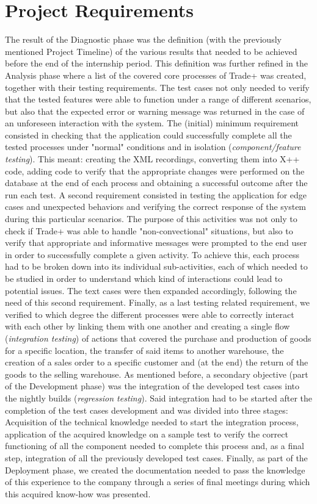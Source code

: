 \chapter{Project Requirements}

The result of the Diagnostic phase was the definition (with the previously mentioned Project Timeline) of the various results that needed to be achieved before the end of the internship period. This definition was further refined in the Analysis phase where a list of the covered core processes of Trade+ was created, together with their testing requirements. 
The test cases not only needed to verify that the tested features were able to function under a range of different scenarios, but also that the expected error or warning message was returned in the case of an unforeseen interaction with the system. 
The (initial) minimum  requirement consisted in checking that the application could successfully complete all the tested processes under "normal" conditions and in isolation (\textit{component/feature testing}). This meant: creating the XML recordings, converting them into X++ code, adding code to verify that the appropriate changes were performed on the database at the end of each process and obtaining a successful outcome after the run each test. 
A second requirement consisted in testing the application for edge cases and unexpected behaviors and verifying the correct response of the system during this particular scenarios. The purpose of this activities was not only to check if Trade+ was able to handle "non-convectional" situations, but also to verify that appropriate and informative messages were prompted to the end user in order to successfully complete a given activity. 
To achieve this, each process had to be broken down into its individual sub-activities, each of which needed to be studied in order to understand which kind of interactions could lead to potential issues. The text cases were then expanded accordingly, following the need of this second requirement. 
Finally, as a last testing related requirement, we verified to which degree the different processes were able to correctly interact with each other by linking them with one another and creating a single flow (\textit{integration testing}) of actions that covered the purchase and production of goods for a specific location, the transfer of said items to another warehouse, the creation of a sales order to a specific customer and (at the end) the return of the goods to the selling warehouse.
As mentioned before, a secondary objective (part of the Development phase) was the integration of the developed test cases into the nightly builds (\textit{regression testing}). Said integration had to be started after the completion of the test cases development and was divided into three stages: Acquisition of the technical knowledge needed to start the integration process, application of the acquired knowledge on a sample test to verify the correct functioning of all the component needed to complete this process and, as a final step, integration of all the previously developed test cases. 
Finally, as part of the Deployment phase, we created the documentation needed to pass the knowledge of this experience to the company through a series of final meetings during which this acquired know-how was presented.